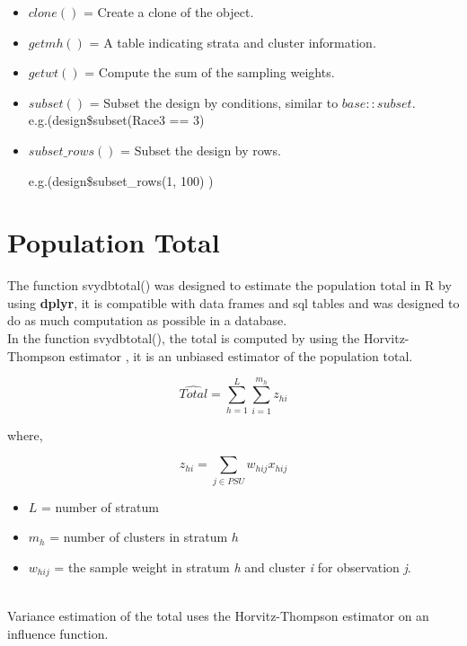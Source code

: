 \begin{itemize}
\item $clone()$ = Create a clone of the object.

\item $getmh()$ = A table indicating strata and cluster information.

\item $getwt()$ = Compute the sum of the sampling weights.

\item $subset()$ = Subset the design by conditions, similar to $base::subset$. \\
                    e.g.({\ttfamilyd design\$subset(Race3 == 3)} 

\item $subset\_rows()$ = Subset the design by rows. 

e.g.({\ttfamily design\$subset\_rows(1, 100)} )

\end{itemize}

\newpage

\section{Population Total} \label{c2:tot} \label{c2.2}



The function {\ttfamily svydbtotal()} was designed to estimate the population total in {\sf R} by using {\bf dplyr}, it is compatible with data frames and sql tables and was designed to do as much computation as possible in a database.\\

In the function {\ttfamily svydbtotal()}, the total is computed by using the Horvitz-Thompson estimator \citep{hte}, it is an unbiased estimator of the population total.

$$ \hat{Total} = \sum_{h = 1}^{L} \sum_{i = 1}^{m_h} z_{hi}$$

where,

$$z_{hi} = \sum_{j \in PSU} w_{hij} x_{hij}$$

\begin{itemize}
\item $L$ = number of stratum

\item $m_h$ = number of clusters in stratum $h$

\item $w_{hij}$ = the sample weight in stratum {\emph h} and cluster {\emph i} for observation {\emph j}.
\end{itemize}
\\
Variance estimation of the total uses the Horvitz-Thompson estimator on an influence function.

